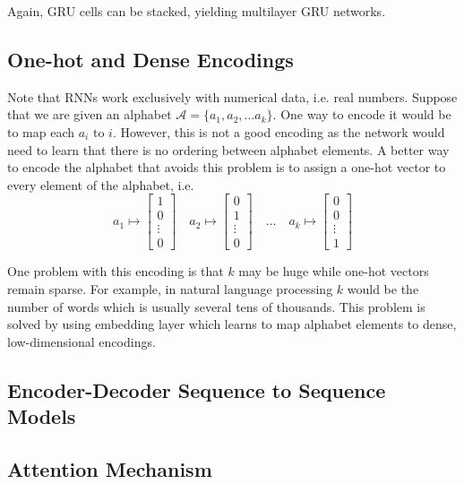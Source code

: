 \documentclass[titlepage]{report}
\begin{document}
Again, GRU cells can be stacked, yielding multilayer GRU networks.

\subsection{One-hot and Dense Encodings}

Note that RNNs work exclusively with numerical data, i.e. real numbers. Suppose that we are given an alphabet $\mathcal{A} = \{ a_1, a_2, \ldots a_k \}$. One way to encode it would be to map each $a_i$ to $i$. However, this is not a good encoding as the network would need to learn that there is no ordering between alphabet elements. A better way to encode the alphabet that avoids this problem is to assign a one-hot vector to every element of the alphabet, i.e.
\begin{equation*}
a_1 \mapsto \begin{bmatrix} 1 \\ 0 \\ \vdots \\ 0 \end{bmatrix} \quad
a_2 \mapsto \begin{bmatrix} 0 \\ 1 \\ \vdots \\ 0 \end{bmatrix} \quad
\ldots \quad
a_k \mapsto \begin{bmatrix} 0 \\ 0 \\ \vdots \\ 1 \end{bmatrix}
\end{equation*}

One problem with this encoding is that $k$ may be huge while one-hot vectors remain sparse. For example, in natural language processing $k$ would be the number of words which is usually several tens of thousands. This problem is solved by using embedding layer which learns to map alphabet elements to dense, low-dimensional encodings.

\subsection{Encoder-Decoder Sequence to Sequence Models}

\subsection{Attention Mechanism}
\end{document}
